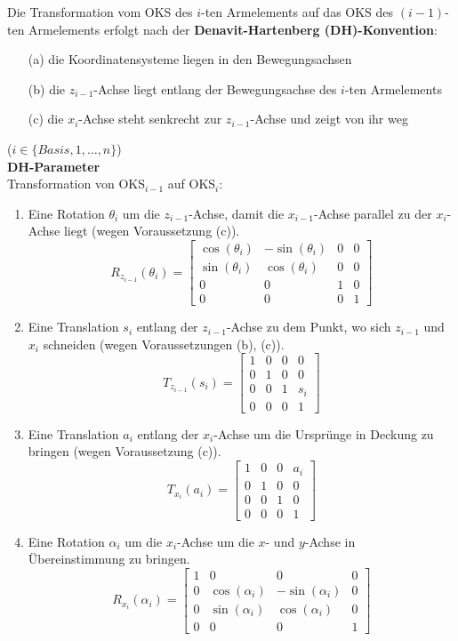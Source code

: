 Die Transformation vom OKS des $i$-ten Armelements auf das OKS des $(i-1)$-ten Armelements erfolgt nach der \textbf{Denavit-Hartenberg (DH)-Konvention}:
\begin{enumerate}
\item[(a)] die Koordinatensysteme liegen in den Bewegungsachsen
\item[(b)] die $z_{i-1}$-Achse liegt entlang der Bewegungsachse des $i$-ten Armelements
\item[(c)] die $x_i$-Achse steht senkrecht zur $z_{i-1}$-Achse und zeigt von ihr weg
\end{enumerate}
($i \in \{ Basis, 1 , \dots , n \}$) \\[0,1cm]
\textbf{DH-Parameter} \\
Transformation von OKS$_{i-1}$ auf OKS$_i$:
\begin{enumerate}
\item Eine Rotation $\theta_i$ um die $z_{i-1}$-Achse, damit die $x_{i-1}$-Achse parallel zu der $x_i$-Achse liegt (wegen Voraussetzung (c)).
$$R_{z_{i-1}}(\theta_i) = \left[ \begin{array}{cccc} \cos(\theta_i) & - \sin(\theta_i) & 0 & 0 \\ \sin(\theta_i) & \cos(\theta_i) & 0 & 0 \\ 0 & 0 & 1 & 0 \\ 0 & 0 & 0 & 1 \end{array} \right]$$
\item Eine Translation $s_i$ entlang der $z_{i-1}$-Achse zu dem Punkt, wo sich $z_{i-1}$ und $x_i$ schneiden (wegen Voraussetzungen (b), (c)).
$$T_{z_{i-1}}(s_i) = \left[ \begin{array}{cccc} 1 & 0 & 0 & 0 \\ 0 & 1 & 0 & 0 \\ 0 & 0 & 1 & s_i \\ 0 & 0 & 0 & 1 \end{array} \right]$$
\item Eine Translation $a_i$ entlang der $x_i$-Achse um die Ursprünge in Deckung zu bringen (wegen Voraussetzung (c)).
$$T_{x_i}(a_i) = \left[ \begin{array}{cccc} 1 & 0 & 0 & a_i \\ 0 & 1 & 0 & 0 \\ 0 & 0 & 1 & 0 \\ 0 & 0 & 0 & 1 \end{array} \right]$$
\item Eine Rotation $\alpha_i$ um die $x_i$-Achse um die $x$- und $y$-Achse in Übereinstimmung zu bringen.
$$R_{x_i}(\alpha_i) = \left[ \begin{array}{cccc} 1 & 0 & 0 & 0 \\ 0 & \cos(\alpha_i) & - \sin(\alpha_i) & 0 \\ 0 & \sin(\alpha_i) & \cos(\alpha_i) & 0 \\ 0 & 0 & 0 & 1 \end{array} \right]$$
\end{enumerate}
